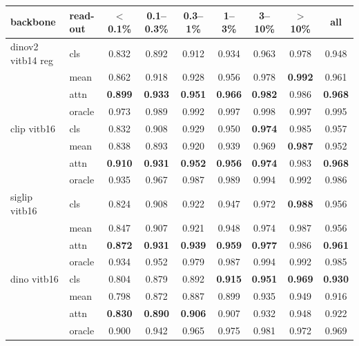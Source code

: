 \begin{tabular}{llccccccc}
\toprule
backbone & read-out & $<$0.1\% & 0.1--0.3\% & 0.3--1\% & 1--3\% & 3--10\% & $>$10\% & all \\
\midrule
dinov2 vitb14 reg & cls & 0.832 & 0.892 & 0.912 & 0.934 & 0.963 & 0.978 & 0.948 \\
 & mean & 0.862 & 0.918 & 0.928 & 0.956 & 0.978 & \textbf{0.992} & 0.961 \\
 & attn & \textbf{0.899} & \textbf{0.933} & \textbf{0.951} & \textbf{0.966} & \textbf{0.982} & 0.986 & \textbf{0.968} \\
 & oracle & 0.973 & 0.989 & 0.992 & 0.997 & 0.998 & 0.997 & 0.995 \\
\midrule
clip vitb16 & cls & 0.832 & 0.908 & 0.929 & 0.950 & \textbf{0.974} & 0.985 & 0.957 \\
 & mean & 0.838 & 0.893 & 0.920 & 0.939 & 0.969 & \textbf{0.987} & 0.952 \\
 & attn & \textbf{0.910} & \textbf{0.931} & \textbf{0.952} & \textbf{0.956} & \textbf{0.974} & 0.983 & \textbf{0.968} \\
 & oracle & 0.935 & 0.967 & 0.987 & 0.989 & 0.994 & 0.992 & 0.986 \\
\midrule
siglip vitb16 & cls & 0.824 & 0.908 & 0.922 & 0.947 & 0.972 & \textbf{0.988} & 0.956 \\
 & mean & 0.847 & 0.907 & 0.921 & 0.948 & 0.974 & 0.987 & 0.956 \\
 & attn & \textbf{0.872} & \textbf{0.931} & \textbf{0.939} & \textbf{0.959} & \textbf{0.977} & 0.986 & \textbf{0.961} \\
 & oracle & 0.934 & 0.952 & 0.979 & 0.987 & 0.994 & 0.992 & 0.985 \\
\midrule
dino vitb16 & cls & 0.804 & 0.879 & 0.892 & \textbf{0.915} & \textbf{0.951} & \textbf{0.969} & \textbf{0.930} \\
 & mean & 0.798 & 0.872 & 0.887 & 0.899 & 0.935 & 0.949 & 0.916 \\
 & attn & \textbf{0.830} & \textbf{0.890} & \textbf{0.906} & 0.907 & 0.932 & 0.948 & 0.922 \\
 & oracle & 0.900 & 0.942 & 0.965 & 0.975 & 0.981 & 0.972 & 0.969 \\
\bottomrule
\end{tabular}
